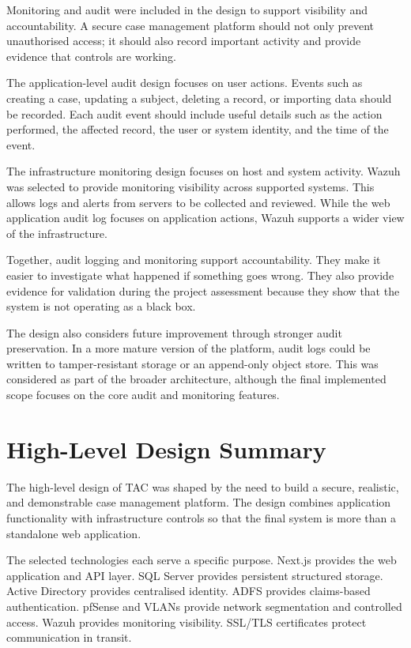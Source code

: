 Monitoring and audit were included in the design to support visibility and accountability. A secure case management platform should not only prevent unauthorised access; it should also record important activity and provide evidence that controls are working.

The application-level audit design focuses on user actions. Events such as creating a case, updating a subject, deleting a record, or importing data should be recorded. Each audit event should include useful details such as the action performed, the affected record, the user or system identity, and the time of the event.

The infrastructure monitoring design focuses on host and system activity. Wazuh was selected to provide monitoring visibility across supported systems. This allows logs and alerts from servers to be collected and reviewed. While the web application audit log focuses on application actions, Wazuh supports a wider view of the infrastructure.

Together, audit logging and monitoring support accountability. They make it easier to investigate what happened if something goes wrong. They also provide evidence for validation during the project assessment because they show that the system is not operating as a black box.

The design also considers future improvement through stronger audit preservation. In a more mature version of the platform, audit logs could be written to tamper-resistant storage or an append-only object store. This was considered as part of the broader architecture, although the final implemented scope focuses on the core audit and monitoring features.


\section{High-Level Design Summary}

The high-level design of TAC was shaped by the need to build a secure, realistic, and demonstrable case management platform. The design combines application functionality with infrastructure controls so that the final system is more than a standalone web application.

The selected technologies each serve a specific purpose. Next.js provides the web application and API layer. SQL Server provides persistent structured storage. Active Directory provides centralised identity. ADFS provides claims-based authentication. pfSense and VLANs provide network segmentation and controlled access. Wazuh provides monitoring visibility. SSL/TLS certificates protect communication in transit.

